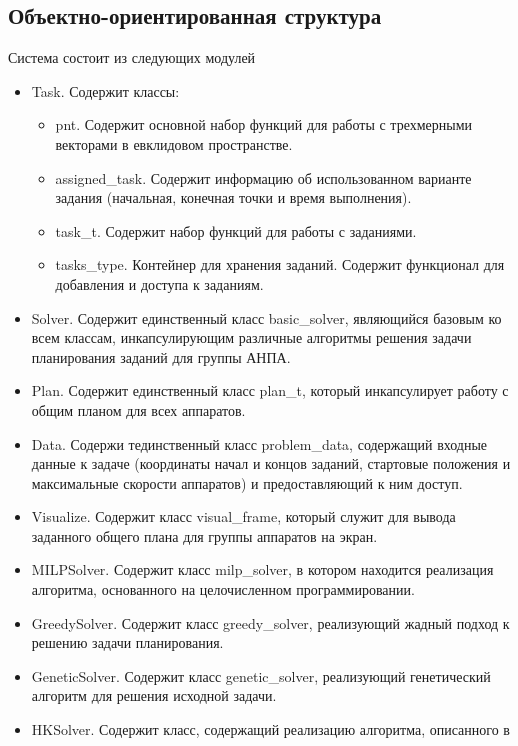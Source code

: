 \documentclass[a4paper,14pt,russian]{article}
\begin{document}
\subsection{Объектно-ориентированная структура}
Система состоит из следующих модулей
\begin{itemize}
\item Task. Содержит классы:
    \begin{itemize}
    \item pnt. Содержит основной набор функций для работы с трехмерными векторами в евклидовом пространстве.
    \item assigned\_task. Содержит информацию об использованном варианте задания (начальная, конечная точки и время выполнения).
    \item task\_t. Содержит набор функций для работы с заданиями.
    \item tasks\_type. Контейнер для хранения заданий. Содержит функционал для добавления и доступа к заданиям.
    \end{itemize}
\item Solver. Содержит единственный класс basic\_solver, являющийся базовым ко всем классам, инкапсулирующим различные алгоритмы решения задачи планирования заданий для группы АНПА.
\item Plan. Содержит единственный класс plan\_t, который инкапсулирует работу с общим планом для всех аппаратов.
\item Data. Содержи тединственный класс problem\_data, содержащий входные данные к задаче (координаты начал и концов заданий, стартовые положения и максимальные скорости аппаратов) и предоставляющий к ним доступ.
\item Visualize. Содержит класс visual\_frame, который служит для вывода заданного общего плана для группы аппаратов на экран.
\item MILPSolver. Содержит класс milp\_solver, в котором находится реализация алгоритма, основанного на целочисленном программировании.
\item GreedySolver. Содержит класс greedy\_solver, реализующий жадный подход к решению задачи планирования.
\item GeneticSolver. Содержит класс genetic\_solver, реализующий генетический алгоритм для решения исходной задачи.
\item HKSolver. Содержит класс, содержащий реализацию алгоритма, описанного в \cite{tuphanov1}
\end{itemize}
\end{document}
